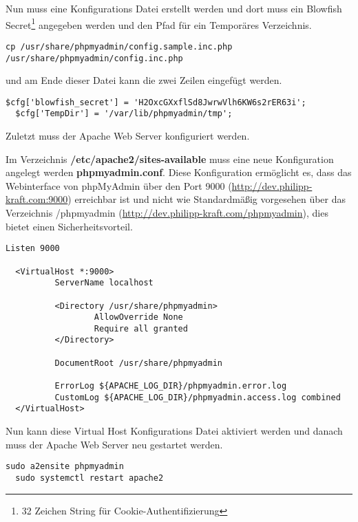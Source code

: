 Nun muss eine Konfigurations Datei erstellt werden und dort muss ein Blowfish
Secret\footnote{32 Zeichen String für Cookie-Authentifizierung} angegeben werden und den Pfad für ein Temporäres Verzeichnis.

\begin{lstlisting}[caption={phpMyAdmin Konfigurationsdatei erstellen}]
  cp /usr/share/phpmyadmin/config.sample.inc.php /usr/share/phpmyadmin/config.inc.php
\end{lstlisting}

und am Ende dieser Datei kann die zwei Zeilen eingefügt werden.

\begin{lstlisting}[caption={phpMyAdmin Blowfish Secret und TempDir}]
  $cfg['blowfish_secret'] = 'H2OxcGXxflSd8JwrwVlh6KW6s2rER63i'; 
  $cfg['TempDir'] = '/var/lib/phpmyadmin/tmp';
\end{lstlisting}

Zuletzt muss der Apache Web Server konfiguriert werden.

Im Verzeichnis \textbf{/etc/apache2/sites-available} muss eine neue
Konfiguration angelegt werden \textbf{phpmyadmin.conf}. Diese Konfiguration
ermöglicht es, dass das Webinterface von phpMyAdmin über den Port 9000 (\url{http://dev.philipp-kraft.com:9000})
erreichbar ist und nicht wie Standardmäßig vorgesehen über das Verzeichnis
/phpmyadmin (\url{http://dev.philipp-kraft.com/phpmyadmin}), dies bietet einen Sicherheitsvorteil.

\begin{lstlisting}[caption={phpmyadmin.conf}]
  Listen 9000

  <VirtualHost *:9000>
          ServerName localhost
  
          <Directory /usr/share/phpmyadmin>
                  AllowOverride None
                  Require all granted
          </Directory>
  
          DocumentRoot /usr/share/phpmyadmin
  
          ErrorLog ${APACHE_LOG_DIR}/phpmyadmin.error.log
          CustomLog ${APACHE_LOG_DIR}/phpmyadmin.access.log combined
  </VirtualHost>
\end{lstlisting}

Nun kann diese Virtual Host Konfigurations Datei aktiviert werden und danach
muss der Apache Web Server neu gestartet werden.

\begin{lstlisting}[caption={Virtual Host aktivieren}]
  sudo a2ensite phpmyadmin
  sudo systemctl restart apache2
\end{lstlisting}